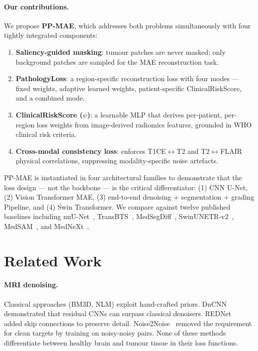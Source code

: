 \documentclass[runningheads]{llncs}
\begin{document}
\paragraph{Our contributions.}
We propose \textbf{PP-MAE}, which addresses both problems simultaneously
with four tightly integrated components:
\begin{enumerate}
    \item \textbf{Saliency-guided masking}: tumour patches are never
          masked; only background patches are sampled for the MAE
          reconstruction task.
    \item \textbf{PathologyLoss}: a region-specific reconstruction loss
          with four modes — fixed weights, adaptive learned weights,
          patient-specific ClinicalRiskScore, and a combined mode.
    \item \textbf{ClinicalRiskScore ($\psi$)}: a learnable MLP that
          derives per-patient, per-region loss weights from image-derived
          radiomics features, grounded in WHO clinical risk criteria.
    \item \textbf{Cross-modal consistency loss}: enforces T1CE$\leftrightarrow$T2
          and T2$\leftrightarrow$FLAIR physical correlations, suppressing
          modality-specific noise artefacts.
\end{enumerate}

PP-MAE is instantiated in four architectural families to demonstrate
that the loss design — not the backbone — is the critical differentiator:
(1) CNN U-Net, (2) Vision Transformer MAE, (3) end-to-end denoising +
segmentation + grading Pipeline, and (4) Swin Transformer. We compare
against twelve published baselines including nnU-Net~\cite{nnunet},
TransBTS~\cite{transbts}, MedSegDiff~\cite{medsegdiff},
SwinUNETR-v2~\cite{swinunetrv2}, MedSAM~\cite{medsam},
and MedNeXt~\cite{mednext}.


\section{Related Work}
\label{sec:related}

\paragraph{MRI denoising.}
Classical approaches (BM3D, NLM) exploit hand-crafted priors.
DnCNN~\cite{dncnn} demonstrated that residual CNNs can surpass classical
denoisers. REDNet~\cite{rednet} added skip connections to preserve detail.
Noise2Noise~\cite{n2n} removed the requirement for clean targets by
training on noisy-noisy pairs. None of these methods differentiate between
healthy brain and tumour tissue in their loss functions.
\end{document}
